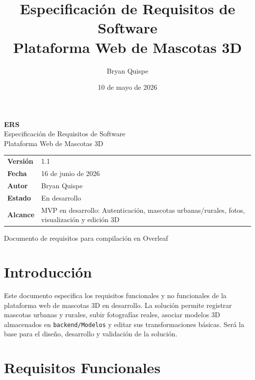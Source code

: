 \documentclass[12pt,a4paper]{article}
\title{\Huge\textbf{Especificaci\'on de Requisitos de Software}\\[0.3em]\Large Plataforma Web de Mascotas 3D}
\author{Bryan Quispe}
\date{10 de mayo de 2026}
\begin{document}
\begin{titlepage}
\centering
\vspace*{1.8cm}
{\Huge\bfseries\color{PrimaryBlue} ERS\\[0.35em]}
{\LARGE Especificaci\'on de Requisitos de Software\\[0.5em]}
{\large Plataforma Web de Mascotas 3D\\[1.2cm]}

\begin{tabular}{p{5cm} p{8cm}}
\rowcolor{SoftGray}
\textbf{Versi\'on} & 1.1 \\
\textbf{Fecha} & 16 de junio de 2026 \\
\textbf{Autor} & Bryan Quispe \\
\textbf{Estado} & En desarrollo \\
\textbf{Alcance} & MVP en desarrollo: Autenticaci\'on, mascotas urbanas/rurales, fotos, visualizaci\'on y edici\'on 3D \\
\end{tabular}

\vfill
{\large Documento de requisitos para compilaci\'on en Overleaf}
\end{titlepage}

\tableofcontents
\newpage

\section{Introducci\'on}
Este documento especifica los requisitos funcionales y no funcionales de la plataforma web de mascotas 3D en desarrollo. La soluci\'on permite registrar mascotas urbanas y rurales, subir fotograf\'ias reales, asociar modelos 3D almacenados en \texttt{backend/Modelos} y editar sus transformaciones b\'asicas. Ser\'a la base para el dise\~no, desarrollo y validaci\'on de la soluci\'on.

\section{Requisitos Funcionales}
\end{document}
